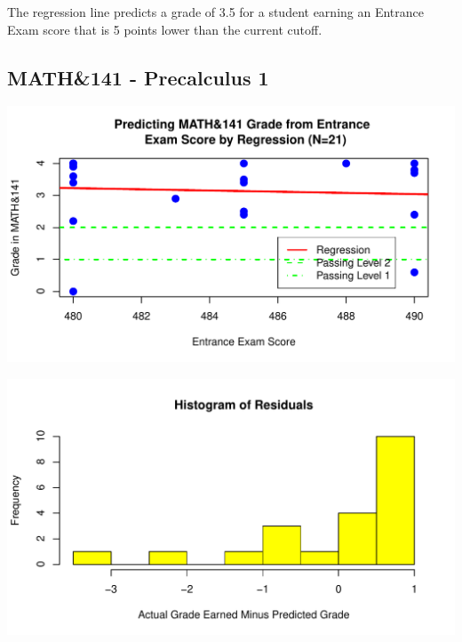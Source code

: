 \documentclass[twoside]{article}\usepackage[]{graphicx}\usepackage[]{color}
\makeatletter
\def\maxwidth{ %
  \ifdim\Gin@nat@width>\linewidth
    \linewidth
  \else
    \Gin@nat@width
  \fi
}
\newenvironment{knitrout}{}{} %
\makeatother
\begin{document}
The regression line predicts a grade of 3.5 for a student earning an Entrance Exam score that is 5 points lower than the current cutoff.


\newpage
\subsection{MATH\&141 - Precalculus 1}


%


\begin{knitrout}
\color{fgcolor}
\includegraphics[width=\maxwidth]{figure/141regressiongraph-1} 

\end{knitrout}

\begin{knitrout}
\color{fgcolor}
\includegraphics[width=\maxwidth]{figure/141residualsplot-1} 

\end{knitrout}
\end{document}
